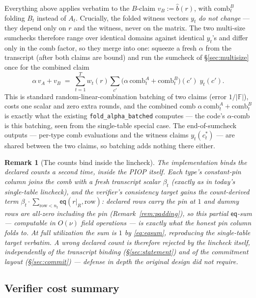 \documentclass[11pt]{article}
\newcommand{\F}{\mathbb{F}}                       %
\newcommand{\eq}{\mathsf{eq}}
\newcommand{\code}[1]{\texttt{#1}}
\newtheorem{remark}{Remark}
\theoremstyle{definition}
\begin{document}
Everything above applies verbatim to the $B$-claim $v_B := \hat b(r)$, with
$\mathrm{comb}^B_t$ folding $B_t$ instead of $A_t$. Crucially, the folded
witness vectors $y_t$ \emph{do not change} --- they depend only on $r$ and
the witness, never on the matrix. The two multi-size sumchecks therefore
range over identical domains against identical $y_t$'s and differ only in
the comb factor, so they merge into one: squeeze a fresh $\alpha$ from the
transcript (after both claims are bound) and run the sumcheck of
\S\ref{sec:multisize} once for the combined claim
\[
  \alpha\, v_A + v_B \;=\; \sum_{t=1}^{T} w_t(r) \sum_{c'}
    \bigl(\alpha\,\mathrm{comb}^A_t + \mathrm{comb}^B_t\bigr)(c')\;
    y_t(c') .
\]
This is standard random-linear-combination batching of two claims (error
$1/|\F|$), costs one scalar and zero extra rounds, and the combined comb
$\alpha\,\mathrm{comb}^A_t + \mathrm{comb}^B_t$ is exactly what the
existing \code{fold\_alpha\_batched} computes --- the code's
$\alpha$-comb is this batching, seen from the single-table special case.
The end-of-sumcheck outputs --- per-type comb evaluations and the witness
claims $y_t(c^*_t)$ --- are shared between the two claims, so batching
adds nothing there either.

\begin{remark}[The counts bind inside the lincheck]\label{rem:pinbind}
The implementation binds the declared counts a \emph{second} time, inside
the PIOP itself. Each type's constant-pin column joins the comb with a
fresh transcript scalar $\beta_t$ (exactly as in today's single-table
lincheck), and the verifier's consistency target gains the
\emph{count-derived} term
$\beta_t \cdot \sum_{\mathrm{row} < n_t} \eq(r|_R, \mathrm{row})$:
declared rows carry the pin at $1$ and dummy rows are all-zero
\emph{including the pin} (Remark~\ref{rem:padding}), so this partial
$\eq$-sum --- computable in $O(\nu)$ field operations --- is exactly what
the honest pin column folds to. At full utilization the sum is $1$ by
\eqref{eq:eqsum}, reproducing the single-table target verbatim. A wrong
declared count is therefore rejected by the lincheck itself, independently
of the transcript binding (\S\ref{sec:statement}) and of the commitment
layout (\S\ref{sec:commit}) --- defense in depth the original design did
not require.
\end{remark}

\subsection{Verifier cost summary}
\end{document}
